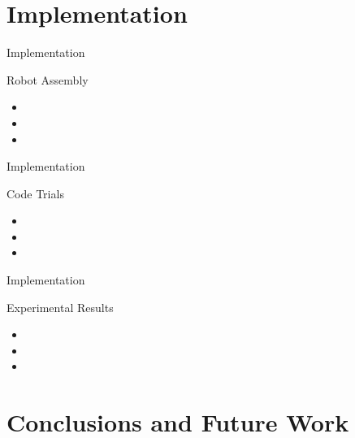 \documentclass{beamer}
\begin{document}

\section{Implementation}

\begin{frame}{Implementation}
\begin{block}{Robot Assembly}
    \begin{itemize}
      \item 
      \item  
      \item 
    \end{itemize}
  \end{block}
\end{frame}

\begin{frame}{Implementation}
\begin{block}{Code Trials}
    \begin{itemize}
      \item 
      \item  
      \item 
    \end{itemize}
  \end{block}
\end{frame}

\begin{frame}{Implementation}
\begin{block}{Experimental Results}
    \begin{itemize}
      \item 
      \item  
      \item 
    \end{itemize}
  \end{block}
\end{frame}


\section{Conclusions and Future Work}
\end{document}
